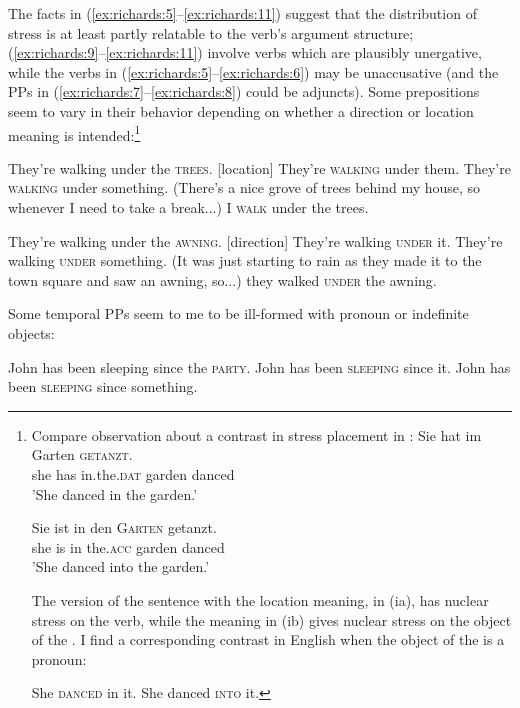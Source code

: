\documentclass[output=paper]{LSP/langsci}
\begin{document}
The facts in (\ref{ex:richards:5}--\ref{ex:richards:11}) suggest that the distribution of stress is at least partly relatable to the verb's argument structure; (\ref{ex:richards:9}--\ref{ex:richards:11}) involve verbs which are plausibly unergative, while the verbs in (\ref{ex:richards:5}--\ref{ex:richards:6}) may be unaccusative (and the PPs in (\ref{ex:richards:7}--\ref{ex:richards:8}) could be adjuncts).  Some prepositions seem to vary in their behavior depending on whether a direction or location meaning is intended:\footnote{Compare  observation about a contrast in stress placement in :
\ea
\ea
\gll Sie hat im   Garten  \textsc{getanzt}.    \\
she has in.the.\textsc{dat} garden  danced \\
\glt   'She danced in the garden.'

\ex 
\gll Sie ist in  den  \textsc{Garten} getanzt.\\
    she is  in  the.\textsc{acc}  garden   danced\\
\glt    'She danced into the garden.'
\z
\z

The version of the sentence with the location meaning, in (ia), has nuclear stress on the verb, while the  meaning in (ib) gives nuclear stress on the object of the .  I find a corresponding contrast in English when the object of the  is a pronoun:

\ea\upshape
\ea She \textsc{danced} in it.
\ex She danced \textsc{into} it.
\z
\z
}


\ea%
    \label{ex:richards:12}
\ea They're walking under the \textsc{trees}.  [location]
\ex They're \textsc{walking} under them.
\ex They're \textsc{walking} under something.
\ex (There's a nice grove of trees behind my house, so whenever I need to take a         break...) I \textsc{walk} under the trees.
\z
\z


\ea%
    \label{ex:richards:13}
\ea They're walking under the \textsc{awning}.  [direction]
\ex They're walking \textsc{under} it.
\ex They're walking \textsc{under} something.
\ex (It was just starting to rain as they made it to the town square and saw an awning,      so...) they walked \textsc{under} the awning.
\z
\z

Some temporal PPs seem to me to be ill-formed with pronoun or indefinite objects:


\ea%
    \label{ex:richards:14}
\ea John has been sleeping since the \textsc{party}.
\ex     *  John has been \textsc{sleeping} since it.
\ex      *  John has been \textsc{sleeping} since something.
\z
\z
\end{document}
